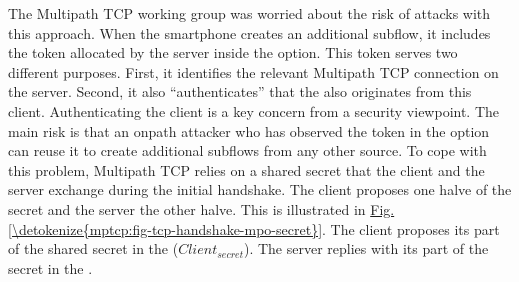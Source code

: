 \documentclass[letterpaper,10pt,english]{sphinxmanual}
\begin{document}
The Multipath TCP working group was worried about the risk of attacks with this approach. When the smartphone creates an additional subflow, it includes the token allocated by the server inside the  option. This token serves two different purposes. First, it identifies the relevant Multipath TCP connection on the server. Second, it also “authenticates” that the  also originates from this client. Authenticating the client is a key concern from a security viewpoint. The main risk is that an on\sphinxhyphen{}path attacker who has observed the token in the  option can reuse it to create additional subflows from any other source. To cope with this problem, Multipath TCP relies on a shared secret that the client and the server exchange during the initial handshake. The client proposes one halve of the secret and the server the other halve. This is illustrated in \hyperref[\detokenize{mptcp:fig-tcp-handshake-mpo-secret}]{Fig.\@ \ref{\detokenize{mptcp:fig-tcp-handshake-mpo-secret}}}. The client proposes its part of the shared secret in the  (\(Client_{secret}\)). The server replies with its part of the secret in the .
\end{document}
